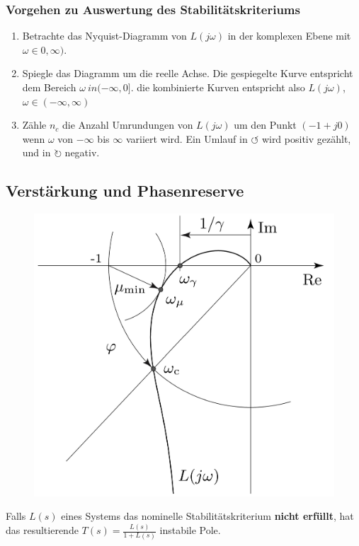        \subsubsection{Vorgehen zu Auswertung des Stabilitätskriteriums}
            \begin{enumerate}
                \item Betrachte das Nyquist-Diagramm von $L(j\omega)$ in der komplexen Ebene mit $\omega\in 0,\infty)$.
                \item Spiegle das Diagramm um die reelle Achse. Die gespiegelte Kurve entspricht dem Bereich $\omega \ in (-\infty,0]$. die kombinierte Kurven entspricht also $L(j\omega)$, $\omega \in (-\infty,\infty)$
                \item Zähle $n_c$ die Anzahl Umrundungen von $L(j\omega)$ um den Punkt $(-1+j0)$ wenn $\omega$ von $-\infty$ bis $\infty$ variiert wird. Ein Umlauf in $\circlearrowleft$ wird positiv gezählt, und in $\circlearrowright$ negativ.
            \end{enumerate}
            
    \subsection{Verstärkung und Phasenreserve}
        \begin{figure}
        \vspace{-4mm}
            \includegraphics[width=\linewidth]{images/07/Robustheit.jpg}
        \end{figure}
        Falls $L(s)$ eines Systems das nominelle Stabilitätskriterium \textbf{nicht erfüllt}, hat das resultierende $T(s)=\frac{L(s)}{1+L(s)}$ instabile Pole. 
        
